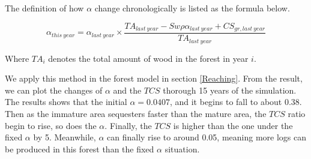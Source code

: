 The definition of how $\alpha$ change chronologically is listed as the formula below.

\begin{equation}
    \alpha_{this\ year} = \alpha_{last\ year} \times \frac{TA_{last\ year} - Sw\rho \alpha_{last\ year} + CS_{gr, last\ year}}{TA_{last\ year}}
\end{equation}

Where $TA_i$ denotes the total amount of wood in the forest in year $i$.

We apply this method in the forest model in section \ref{Reaching}. From the result, we can plot the changes of $\alpha$ and the $TCS$ thorough 15 years of the simulation. The results shows that the initial $\alpha = 0.0407$, and it begins to fall to about 0.38. Then as the immature area sequesters faster than the mature area, the $TCS$ ratio begin to rise, so does the $\alpha$. Finally, the $TCS$ is higher than the one under the fixed $\alpha$ by 5\textperthousand. Meanwhile, $\alpha$ can finally rise to around 0.05, meaning more logs can be produced in this forest than the fixed $\alpha$ situation. 


